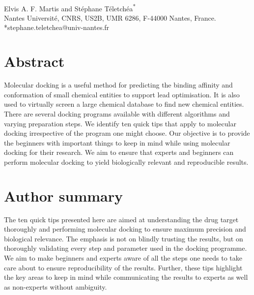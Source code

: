\documentclass[10pt,letterpaper]{article}
\begin{document}
\vspace*{0.2in}
\begin{flushleft}
{\Large
\textbf{}
}
\newline
\\
Elvis A. F. Martis and
Stéphane Téletchéa\textsuperscript{*}
\\
\bigskip
Nantes Université, CNRS, US2B, UMR 6286, F-44000 Nantes, France.
\bigskip
*stephane.teletchea@univ-nantes.fr

\end{flushleft}
\section*{Abstract}
Molecular docking is a useful method for predicting the binding affinity and conformation of small chemical entities to support lead optimisation. It is also used to virtually screen a large chemical database to find new chemical entities. There are several docking programs available with different algorithms and varying preparation steps. We identify ten quick tips that apply to molecular docking irrespective of the program one might choose. Our objective is to provide the beginners with important things to keep in mind while using molecular docking for their research. We aim to ensure that experts and beginners can perform molecular docking to yield biologically relevant and reproducible results. 

\section*{Author summary}
The ten quick tips presented here are aimed at understanding the drug target thoroughly and performing molecular docking to ensure maximum precision and biological relevance. The emphasis is not on blindly trusting the results, but on thoroughly validating every step and parameter used in the docking programme. We aim to make beginners and experts aware of all the steps one needs to take care about to ensure reproducibility of the results. Further, these tips highlight the key areas to keep in mind while communicating the results to experts as well as non-experts without ambiguity. 

\linenumbers
\end{document}
